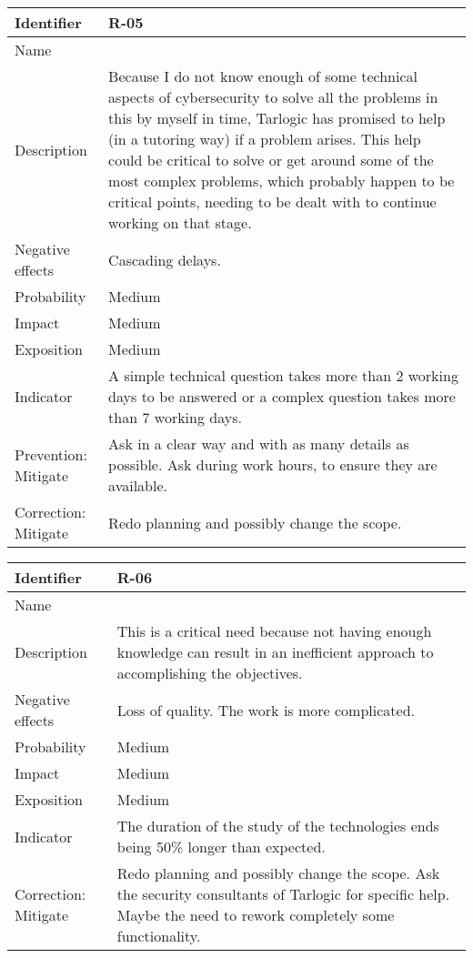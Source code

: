 \begin{table}[H]
	\begin{tabularx}{\textwidth}{|y|z|}
		\hline
		Identifier & \textbf{R-05} \\ \hline
		Name & \Rcinco \\ \hline
		Description &
			Because I do not know enough of some technical aspects of cybersecurity to solve all the problems in this by myself in time, Tarlogic has promised to help (in a tutoring way) if a problem arises. \linej
			This help could be critical to solve or get around some of the most complex problems, which probably happen to be critical points, needing to be dealt with to continue working on that stage.
		\\ \hline
		Negative effects &
			Cascading delays.
		\\ \hline
		Probability & Medium\\ \hline
		Impact &  Medium\\ \hline
		Exposition &  Medium\\ \hline
		Indicator & A simple technical question takes more than 2 working days to be answered or a complex question takes more than 7 working days.\\ \hline
		Prevention: Mitigate &
			Ask in a clear way and with as many details as possible. \linej
			Ask during work hours, to ensure they are available.
		\\ \hline
		Correction: Mitigate &
			Redo planning and possibly change the scope.
		\\ \hline
	\end{tabularx}
\end{table}

\begin{table}[H]
	\begin{tabularx}{\textwidth}{|y|z|}
		\hline
		Identifier & \textbf{R-06} \\ \hline
		Name & \Rseis \\ \hline
		Description &
			This is a critical need because not having enough knowledge can result in an inefficient approach to accomplishing the objectives.
		\\ \hline
		Negative effects &
			Loss of quality. \linej
			The work is more complicated.
		\\ \hline
		Probability & Medium\\ \hline
		Impact &  Medium\\ \hline
		Exposition &  Medium\\ \hline
		Indicator & The duration of the study of the technologies ends being 50\% longer than expected. \\ \hline
		Correction: Mitigate &
			Redo planning and possibly change the scope.  \linej
			Ask the security consultants of Tarlogic for specific help. \linej
			Maybe the need to rework completely some functionality.
		\\ \hline
	\end{tabularx}
\end{table}


